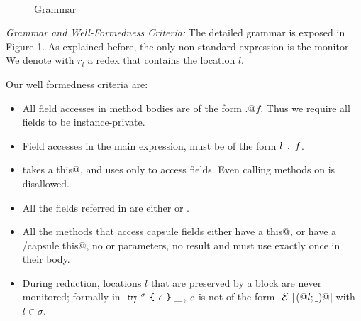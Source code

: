 \begin{figure}
\begin{grammatica}
\\
\\
\\
\\
\\
\\
\end{grammatica}
\caption{Grammar}
\end{figure}


\loseSpace
\noindent\textit{Grammar and Well-Formedness Criteria:}
The detailed grammar is exposed in Figure 1.
As explained before, the only non-standard expression is the monitor.
We denote with $r_l$ a redex that contains the location $l$.

\noindent Our well formedness criteria are:
\begin{itemize}
\item All field accesses in method bodies are of the form
\Q@this.@$f$. Thus we require all fields to be instance-private.

\item Field accesses in the main expression, 
must be of the form $l{ \mbox{ {\texttt{.}} } }\mathit{f}$.

\item \validate{} takes a \Q@read this@, and uses \Q@this@ only to access fields. Even calling methods on \Q@this@
is disallowed.
\item All the fields referred in \validate{} are either \Q@imm@ or \Q@capsule@.
\item All the methods that access capsule fields 
either have a \Q@read this@,
or have a \Q@mut/capsule this@, no \Q@mut@ or \Q@read@ parameters, no \Q@mut@ result and 
must use \Q@this@ exactly once in their body.
\item 
During reduction, locations $l$ that are preserved by a \Q@try@ block are
never monitored; formally 
in $\Kw{try}^\sigma\oC\e\cC\_$, ${\mathit{e}}$ is not of the form $\ctx[$\Q@M(@$l;\_$\Q@)@$]$ with $l\in\sigma$.
\end{itemize}

